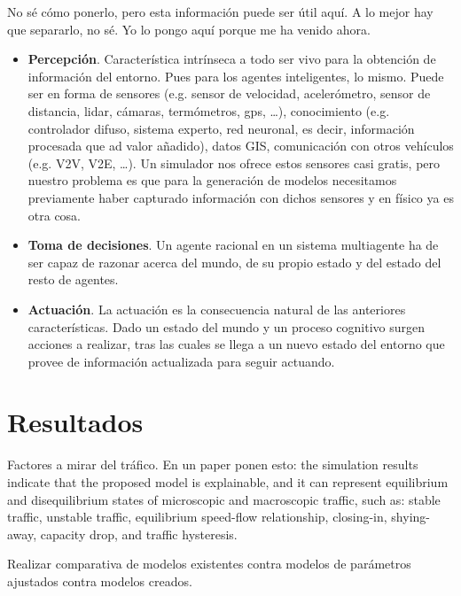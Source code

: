 No sé cómo ponerlo, pero esta información puede ser útil aquí. A lo mejor hay que separarlo, no sé. Yo lo pongo aquí porque me ha venido ahora.

\begin{itemize}
	\item \textbf{Percepción}. Característica intrínseca a todo ser vivo para la obtención de información del entorno. Pues para los agentes inteligentes, lo mismo. Puede ser en forma de sensores (e.g. sensor de velocidad, acelerómetro, sensor de distancia, lidar, cámaras, termómetros, gps, \ldots), conocimiento (e.g. controlador difuso, sistema experto, red neuronal, es decir, información procesada que ad valor añadido), datos GIS, comunicación con otros vehículos (e.g. V2V, V2E, \ldots). Un simulador nos ofrece estos sensores casi gratis, pero nuestro problema es que para la generación de modelos necesitamos previamente haber capturado información con dichos sensores y en físico ya es otra cosa.
	\item \textbf{Toma de decisiones}. Un agente racional en un sistema multiagente ha de ser capaz de razonar acerca del mundo, de su propio estado y del estado del resto de agentes.
	\item \textbf{Actuación}. La actuación es la consecuencia natural de las anteriores características. Dado un estado del mundo y un proceso cognitivo surgen acciones a realizar, tras las cuales se llega a un nuevo estado del entorno que provee de información actualizada para seguir actuando.
\end{itemize}


\section{Resultados}
\label{ch:behavior-models-study:results}

Factores a mirar del tráfico. En un paper ponen esto: the simulation  results indicate that the proposed model is explainable, and it can represent equilibrium and disequilibrium states of microscopic and macroscopic traffic, such as: stable traffic, unstable traffic, equilibrium speed-flow relationship, closing-in, shying-away, capacity drop, and traffic hysteresis.

Realizar comparativa de modelos existentes contra modelos de parámetros ajustados contra modelos creados.